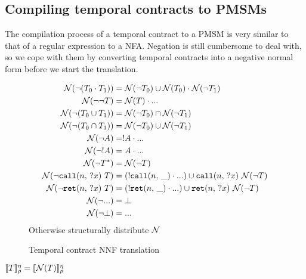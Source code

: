 \subsection{Compiling temporal contracts to PMSMs}
%
The compilation process of a temporal contract to a PMSM is very similar to that of a regular expression to a NFA.
%
Negation is still cumbersome to deal with, so we cope with them by converting temporal contracts into a negative normal form before we start the translation.
%
\begin{figure}
  \begin{align*}
    {\mathcal N}(\neg (T_0 \cdot T_1)) &=
      {\mathcal N}(\neg T_0) \cup {\mathcal N}(T_0) \cdot {\mathcal N}(\neg T_1)
\\
    {\mathcal N}(\neg \neg T) &= {\mathcal N}(T) \cdot {\tt ...}
\\
    {\mathcal N}(\neg (T_0 \cup T_1)) &= {\mathcal N}(\neg T_0) \cap {\mathcal N}(\neg T_1)
\\
    {\mathcal N}(\neg (T_0 \cap T_1)) &= {\mathcal N}(\neg T_0) \cup {\mathcal N}(\neg T_1)
\\
    {\mathcal N}(\neg A) &= ! A \cdot {\tt ...}
\\
    {\mathcal N}(\neg ! A) &= A \cdot {\tt ...}
\\
    {\mathcal N}(\neg T^*) &= {\mathcal N}(\neg T)
\\
    {\mathcal N}(\neg {\tt call}(n,\, {\tt ?}x)\ T) &= (! {\tt call}(n,\, \_) \cdot {\tt ...}) \cup {\tt call}(n,\, {\tt ?}x)\ {\mathcal N}(\neg T)
\\
    {\mathcal N}(\neg {\tt ret}(n,\, {\tt ?}x)\ T) &= (! {\tt ret}(n,\, \_) \cdot {\tt ...}) \cup {\tt ret}(n,\, {\tt ?}x)\ {\mathcal N}(\neg T)
\\
    {\mathcal N}(\neg {\tt ...}) &= \bot
\\
    {\mathcal N}(\neg \bot) &= {\tt ...}
  \end{align*}
  Otherwise structurally distribute ${\mathcal N}$
  \caption{Temporal contract NNF translation}
  \label{fig:nnf}
\end{figure}
\begin{theorem}
  $[\![ T ]\!]^{\eta}_{\rho} = [\![ {\mathcal N}(T) ]\!]^{\eta}_{\rho}$
\end{theorem}
